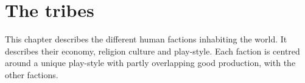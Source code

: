 \chapter{The tribes}\label{ch:Tribes}
This chapter describes the different human factions inhabiting the world. It
describes their economy, religion culture and play-style. Each faction is
centred around a unique play-style with partly overlapping good production,
with the other factions.














